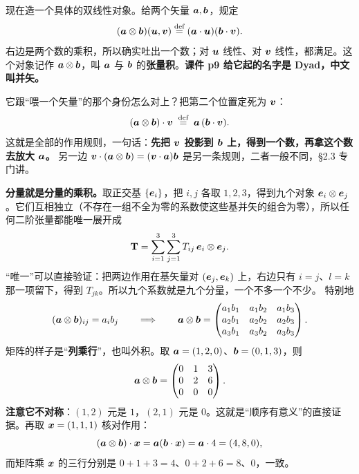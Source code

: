 \documentclass[11pt]{ctexart}
\newcommand{\ten}[1]{\mathbf{#1}}
\let\origsubhdr\subhdr
\renewcommand{\subhdr}[1]{\par\needspace{3\baselineskip}\origsubhdr{#1}}
\begin{document}

现在造一个具体的双线性对象。给两个矢量 $\boldsymbol{a},\boldsymbol{b}$，规定
\[
(\boldsymbol{a}\otimes\boldsymbol{b})(\boldsymbol{u},\boldsymbol{v})\stackrel{\text{def}}{=}(\boldsymbol{a}\cdot\boldsymbol{u})(\boldsymbol{b}\cdot\boldsymbol{v}).
\]
右边是两个数的乘积，所以确实吐出一个数；对 $\boldsymbol{u}$ 线性、对 $\boldsymbol{v}$ 线性，都满足。这个对象记作 $\boldsymbol{a}\otimes\boldsymbol{b}$，叫 $\boldsymbol{a}$ 与 $\boldsymbol{b}$ 的\textbf{张量积}。\textbf{课件 p9 给它起的名字是 Dyad，中文叫并矢。}

它跟“喂一个矢量”的那个身份怎么对上？把第二个位置定死为 $\boldsymbol{v}$：
\[
(\boldsymbol{a}\otimes\boldsymbol{b})\cdot\boldsymbol{v}\;\stackrel{\text{def}}{=}\;\boldsymbol{a}\,(\boldsymbol{b}\cdot\boldsymbol{v}).
\]
这就是全部的作用规则，一句话：\textbf{先把 $\boldsymbol{v}$ 投影到 $\boldsymbol{b}$ 上，得到一个数，再拿这个数去放大 $\boldsymbol{a}$。}
另一边 $\boldsymbol{v}\cdot(\boldsymbol{a}\otimes\boldsymbol{b})=(\boldsymbol{v}\cdot\boldsymbol{a})\boldsymbol{b}$ 是另一条规则，二者一般不同，§2.3 专门讲。

\textbf{分量就是分量的乘积。}取正交基 $\{\boldsymbol{e}_i\}$，把 $i,j$ 各取 $1,2,3$，得到九个对象 $\boldsymbol{e}_i\otimes\boldsymbol{e}_j$。它们互相独立（不存在一组不全为零的系数使这些基并矢的组合为零），所以任何二阶张量都能唯一展开成
\[
\ten T=\sum_{i=1}^{3}\sum_{j=1}^{3}T_{ij}\,\vect e_i\otimes\vect e_j .
\]
“唯一”可以直接验证：把两边作用在基矢量对 $(\boldsymbol{e}_j,\boldsymbol{e}_k)$ 上，右边只有 $i=j$、$l=k$ 那一项留下，得到 $T_{jk}$。所以九个系数就是九个分量，一个不多一个不少。
特别地
\[
(\boldsymbol{a}\otimes\boldsymbol{b})_{ij}=a_ib_j
\qquad\Longrightarrow\qquad
\boldsymbol{a}\otimes\boldsymbol{b}=
\begin{pmatrix}
a_1b_1&a_1b_2&a_1b_3\\
a_2b_1&a_2b_2&a_2b_3\\
a_3b_1&a_3b_2&a_3b_3
\end{pmatrix}.
\]
矩阵的样子是“\textbf{列乘行}”，也叫外积。取 $\boldsymbol{a}=(1,2,0)$、$\boldsymbol{b}=(0,1,3)$，则
\[
\boldsymbol{a}\otimes\boldsymbol{b}=\begin{pmatrix}0&1&3\\0&2&6\\0&0&0\end{pmatrix}.
\]
\textbf{注意它不对称}：$(1,2)$ 元是 $1$，$(2,1)$ 元是 $0$。这就是“顺序有意义”的直接证据。再取 $\boldsymbol{x}=(1,1,1)$ 核对作用：
\[
(\boldsymbol{a}\otimes\boldsymbol{b})\cdot\boldsymbol{x}=\boldsymbol{a}(\boldsymbol{b}\cdot\boldsymbol{x})=\boldsymbol{a}\cdot4=(4,8,0),
\]
而矩阵乘 $\boldsymbol{x}$ 的三行分别是 $0+1+3=4$、$0+2+6=8$、$0$，一致。
\end{document}
